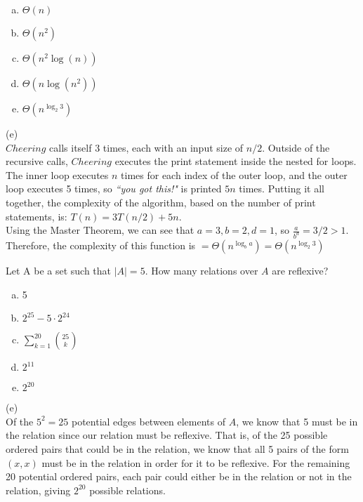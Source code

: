 \begin{enumerate}[(a)]
	\item  $\Theta(n)$

	\item  $\Theta(n^2)$

	\item  $\Theta(n^2\log(n))$

	\item  $\Theta(n \log(n^2))$

	\item  $\Theta(n^{\log_2 3})$

\end{enumerate}
\begin{solution}

(e)\\
$Cheering$ calls itself 3 times, each with an input size of $n/2$. Outside of the recursive calls, $Cheering$ executes the print statement inside the nested for loops. The inner loop executes $n$ times for each index of the outer loop, and the outer loop executes 5 times, so \textit{``you got this!"} is printed $5n$ times.
Putting it all together, the complexity of the algorithm, based on the number of print statements, is:
$T(n) = 3T(n/2) + 5n$.\\

 Using the Master Theorem, we can see that $a = 3, b = 2, d = 1$, so $\frac{a}{b^d} = 3/2 > 1$. Therefore, the complexity of this function is $=\Theta(n^{\log_b a})= \Theta(n^{\log_2 3})$

\end{solution}


Let A be a set such that $|A| = 5$. How many relations over $A$ are reflexive? 

\begin{enumerate}[(a)]
	\item  5
    
	\item  $2^{25} - 5 \cdot 2^{24}$
    
	\item  $\sum\limits_{k=1}^{20} \binom{25}{k}$ 
    
	\item  $2^{11}$
    
	\item  $2^{20}$

\end{enumerate}
\begin{solution}

(e) \\
Of the $5^2 = 25$ potential  edges between elements of $A$, we know that 5 must be in the relation since our relation must be reflexive. That is, of the 25 possible ordered pairs that could be in the relation, we know that all 5 pairs of the form $(x,x)$ must be in the relation in order for it to be reflexive. For the remaining 20 potential ordered pairs, each pair could either be in the relation or not in the relation, giving  $2^{20}$ possible relations.

\end{solution}


